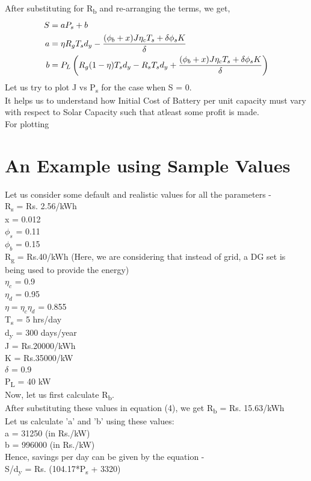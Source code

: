 \documentclass{article}
\begin{document}
\newline
After substituting for R\textsubscript{b} and re-arranging the terms, we get,\\
\begin{align}
	S &= a P_s + b \label{eq:main} \\
	a &= \eta R_g T_s d_y - \frac{(\phi_b + x)J \eta_c T_s + \delta \phi_s K}{\delta} \notag \\
	b &= P_L \left( R_g (1 - \eta) T_s d_y - R_s T_s d_y + \frac{(\phi_b + x) J \eta_c T_s + \delta \phi_s K}{\delta} \right) \notag
\end{align}
\newline
\newline
Let us try to plot J vs P\textsubscript{s} for the case when S = 0.\\
It helps us to understand how Initial Cost of Battery per unit capacity must vary with respect to Solar Capacity such that atleast some profit is made.\\
For plotting
\section{An Example using Sample Values}
Let us consider some default and realistic values for all the parameters -\\
R\textsubscript{s} = Rs. 2.56/kWh\\
x = 0.012\\
\(\phi_s\) = 0.11\\
\(\phi_b\) = 0.15 \\
R\textsubscript{g} = Rs.40/kWh (Here, we are considering that instead of grid, a DG set is being used to provide the energy)\\
\(\eta_c\) = 0.9\\
\(\eta_d\) = 0.95\\
\(\eta = \eta_c \eta_d\) = 0.855\\
T\textsubscript{s} = 5 hrs/day\\
d\textsubscript{y} = 300 days/year\\
J = Rs.20000/kWh\\
K = Rs.35000/kW\\
\(\delta\) = 0.9\\
P\textsubscript{L} = 40 kW\\
\newline
Now, let us first calculate R\textsubscript{b}.\\
After substituting these values in equation (4), we get R\textsubscript{b} = Rs. 15.63/kWh\\
\newline
Let us calculate 'a' and 'b' using these values: \\
a = 31250 (in Rs./kW)\\
b = 996000 (in Rs./kW)\\
\newline
Hence, savings per day can be given by the equation -\\
S/d\textsubscript{y} = Rs. (104.17*P\textsubscript{s} + 3320)\\
\newline
\end{document}
